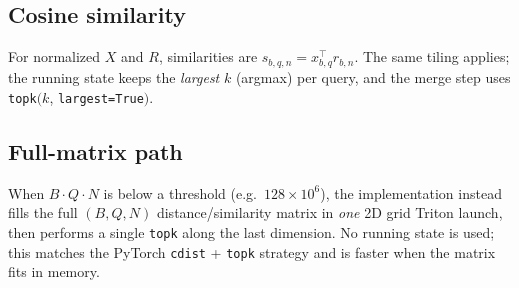 \documentclass[11pt]{article}
\begin{document}
\subsection*{Cosine similarity}

For normalized $X$ and $R$, similarities are $s_{b,q,n} = x_{b,q}^\top r_{b,n}$. The same tiling applies; the running state keeps the \emph{largest} $k$ (argmax) per query, and the merge step uses \texttt{topk}$(k$, \texttt{largest=True}$)$.

\subsection*{Full-matrix path}

When $B \cdot Q \cdot N$ is below a threshold (e.g.\ $128 \times 10^6$), the implementation instead fills the full $(B,Q,N)$ distance/similarity matrix in \emph{one} 2D grid Triton launch, then performs a single \texttt{topk} along the last dimension. No running state is used; this matches the PyTorch \texttt{cdist} + \texttt{topk} strategy and is faster when the matrix fits in memory.
\end{document}
